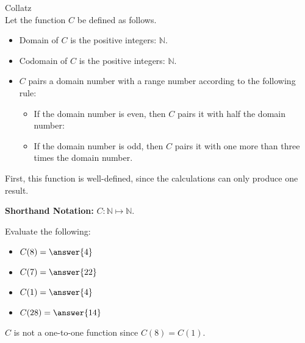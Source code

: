 \documentclass{ximera}
\begin{document}
\begin{example} Collatz \\

Let the function $C$ be defined as follows.


\begin{itemize}
\item Domain of $C$ is the positive integers: $\mathbb{N}$.
\item Codomain of $C$ is the positive integers: $\mathbb{N}$.
\item $C$ pairs a domain number with a range number according to the following rule:
	\begin{itemize}
			\item If the domain number is even, then $C$ pairs it with half the domain number:
			\item If the domain number is odd, then $C$ pairs it with one more than three times the domain number.
	\end{itemize}
\end{itemize}


First, this function is well-defined, since the calculations can only produce one result.


\textbf{Shorthand Notation: } $C: \mathbb{N} \mapsto \mathbb{N}$.

\begin{question}
Evaluate the following:

\begin{itemize}
	\item $C(8) = \answer{4}$
	\item $C(7) = \answer{22}$
	\item $C(1) = \answer{4}$
	\item $C(28) = \answer{14}$
\end{itemize}

\end{question}



$C$ is not a one-to-one function since $C(8) = C(1)$.


\end{example}
\end{document}

